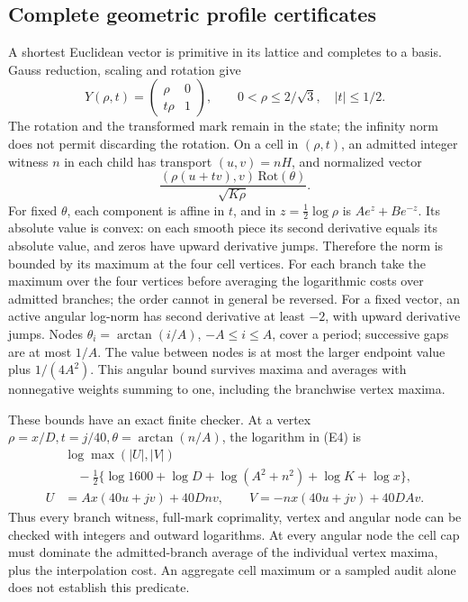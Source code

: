 \documentclass[11pt]{article}
\theoremstyle{definition}\newtheorem{definition}[theorem]{Definition}
\theoremstyle{remark}\newtheorem{remark}[theorem]{Remark}
\begin{document}
\subsection{Complete geometric profile certificates}
A shortest Euclidean vector is primitive in its lattice and completes
to a basis. Gauss reduction, scaling and rotation give
\[
 Y(\rho,t)=\begin{pmatrix}\rho&0\\t\rho&1\end{pmatrix},\qquad
 0<\rho\le2/\sqrt3,\quad |t|\le1/2 .                                \tag{E3}
\]
The rotation and the transformed mark remain in the state; the infinity
norm does not permit discarding the rotation. On a cell in \((\rho,t)\),
an admitted integer witness \(n\) in each child has transport
\((u,v)=nH\), and normalized vector
\[
  \frac{(\rho(u+tv),v)\,\mathrm{Rot}(\theta)}{\sqrt{K\rho}}.
                                                                    \tag{E4}
\]
For fixed \(\theta\), each component is affine in \(t\), and in
\(z=\tfrac12\log\rho\) is \(Ae^z+Be^{-z}\). Its absolute value is
convex: on each smooth piece its second derivative equals its absolute
value, and zeros have upward derivative jumps. Therefore the norm is
bounded by its maximum at the four cell vertices.
For each branch take the maximum over the four vertices before averaging
the logarithmic costs over admitted branches; the order cannot in general
be reversed. For a fixed vector, an active angular log-norm has second derivative
at least \(-2\), with upward derivative jumps. Nodes
\(\theta_i=\arctan(i/A)\), \(-A\le i\le A\), cover a period;
successive gaps are at most \(1/A\). The value between nodes is at
most the larger endpoint value plus \(1/(4A^2)\).
This angular bound survives maxima and averages with nonnegative
weights summing to one, including the branchwise vertex maxima.

These bounds have an exact finite checker. At a vertex
\(\rho=x/D,t=j/40,\theta=\arctan(n/A)\), the logarithm in (E4) is
\[
\begin{split}
 &\log\max(|U|,|V|)\\
 &\quad-\tfrac12\{\log1600+\log D+\log(A^2+n^2)+\log K+\log x\},\\
 U&=Ax(40u+jv)+40Dnv,\qquad
 V=-nx(40u+jv)+40DAv .
\end{split}                                                        \tag{E5}
\]
Thus every branch witness, full-mark coprimality, vertex and angular
node can be checked with integers and outward logarithms.
At every angular node the cell cap must dominate the admitted-branch
average of the individual vertex maxima, plus the interpolation cost. An aggregate cell
maximum or a sampled audit alone does not establish this predicate.
\end{document}
